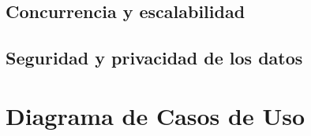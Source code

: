 \textoBaseAlt

\subsection{Concurrencia y escalabilidad}
\label{subsec:concurrencia_escalabilidad}

\textoBase

\subsection{Seguridad y privacidad de los datos}
\label{subsec:seguridad_privacidad}

\textoBaseAlt

\section{Diagrama de Casos de Uso}
\label{sec:casos_uso}

\textoBase

